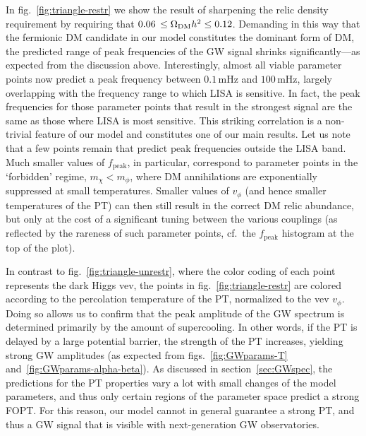 In fig.~\ref{fig:triangle-restr} we show the result of sharpening the relic density requirement by requiring that $0.06 \, \leq \Omega_{\text{DM}} h^2 \leq 0.12$. Demanding in this way that the fermionic \ac{DM} candidate in our model constitutes the dominant form of \ac{DM}, the predicted range of peak frequencies of the \ac{GW} signal shrinks significantly---as expected from the discussion above. Interestingly, almost all viable parameter points now predict a peak frequency between $0.1 \, \mathrm{mHz}$ and $100 \, \mathrm{mHz}$, largely overlapping with the frequency range to which \ac{LISA} is sensitive. In fact, the peak frequencies for those parameter points that result in the strongest signal are  the same as those where \ac{LISA} is most sensitive. This striking correlation is a non-trivial feature of our model and constitutes one of our main results. Let us note that a few points remain that predict peak frequencies outside the \ac{LISA} band. Much smaller values of $f_\mathrm{peak}$, in particular, correspond to parameter points in the `forbidden' regime, $m_\chi < m_\phi$, where \ac{DM} annihilations are exponentially suppressed at small temperatures. Smaller values of $v_\phi$ (and hence smaller temperatures of the \ac{PT}) can then still result in the correct \ac{DM}
relic abundance, but only at the cost of a significant tuning between the various couplings (as reflected by the rareness of such parameter points, cf.~the $f_\mathrm{peak}$ histogram at the top of the plot).

In contrast to fig.~\ref{fig:triangle-unrestr}, where the color coding of each point represents the dark Higgs \ac{vev}, the points in fig.~\ref{fig:triangle-restr} are colored according to the percolation temperature of the \ac{PT}, normalized to the \ac{vev} $v_\phi$. Doing so allows us to confirm that the peak amplitude  of the \ac{GW} spectrum is determined primarily by the amount of supercooling. In other words, if the \ac{PT} is delayed by a large potential barrier, the strength of the \ac{PT} increases, yielding strong \ac{GW} amplitudes (as expected from figs.~\ref{fig:GWparams-T} and~\ref{fig:GWparams-alpha-beta}). As discussed in section~\ref{sec:GWspec}, the predictions for the \ac{PT} properties vary a lot with small changes of the model parameters, and thus only certain regions of the parameter space predict a strong \ac{FOPT}. For this reason, our model cannot in general guarantee a strong \ac{PT}, and thus a \ac{GW} signal that is visible with next-generation \ac{GW} observatories.

